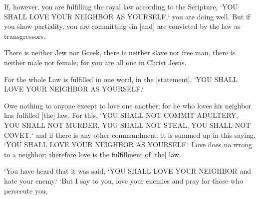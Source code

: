 \vspace{2\baselineskip}

\begin{scripture}[James 2:8-9]
    If, however, you are fulfilling the royal law according to the Scripture, `YOU SHALL LOVE YOUR NEIGHBOR AS YOURSELF,` you are doing well.
    But if you show partiality, you are committing sin [and] are convicted by the law as transgressors.
\end{scripture}

\vspace{2\baselineskip}

\begin{scripture}[Galatians 3:28]
    There is neither Jew nor Greek, there is neither slave nor free man, there is neither male nor female; for you are all one in Christ Jesus.
\end{scripture}

\vspace{2\baselineskip}

\begin{scripture}[Galatians 5:14]
    For the whole Law is fulfilled in one word, in the [statement], `YOU SHALL LOVE YOUR NEIGHBOR AS YOURSELF.`
\end{scripture}

\vspace{2\baselineskip}

\begin{scripture}[Romans 13:8-10]
    Owe nothing to anyone except to love one another; for he who loves his neighbor has fulfilled [the] law.
    For this, `YOU SHALL NOT COMMIT ADULTERY, YOU SHALL NOT MURDER, YOU SHALL NOT STEAL, YOU SHALL NOT COVET,` and if there is any other commandment, it is summed up in this saying, `YOU SHALL LOVE YOUR NEIGHBOR AS YOURSELF.`
    Love does no wrong to a neighbor; therefore love is the fulfillment of [the] law.
\end{scripture}

\vspace{2\baselineskip}

\begin{scripture}[Matthew 5:43-44]
    `You have heard that it was said, `YOU SHALL LOVE YOUR NEIGHBOR and hate your enemy.`
    `But I say to you, love your enemies and pray for those who persecute you,
\end{scripture}
